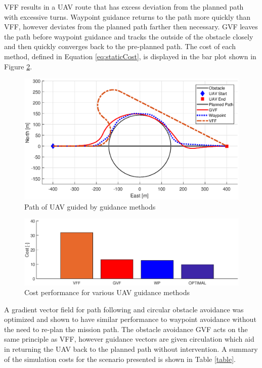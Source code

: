 \documentclass[numbered,pdftex]{ohio-etd}
\begin{document}
VFF results in a UAV route that has excess deviation from the planned path with excessive turns. Waypoint guidance returns to the path more quickly than VFF, however deviates from the planned path farther then necessary. GVF leaves the path before waypoint guidance and tracks the outside of the obstacle closely and then quickly converges back to the pre-planned path. The cost of each method, defined in Equation \ref{eq:staticCost}, is displayed in the bar plot shown in Figure \ref{fig:barplotperformance}.


\begin{figure}[H]
	\centering
	\includegraphics[trim=0 50 0 65,clip,width=15cm]{Figures/Simulations/compareMethods}
	\caption{Path of UAV guided by guidance methods}
	\label{fig:comparemethods}
\end{figure}


\begin{figure}[H]
	\centering
	\label{fig:barPlotCost}
	\includegraphics[width=15cm]{Figures/Simulations/barPlotPerformance}
	\caption{Cost performance for various UAV guidance methods}
	\label{fig:barplotperformance}
\end{figure}

A gradient vector field for path following and circular obstacle avoidance was optimized and shown to have similar performance to waypoint avoidance without the need to re-plan the mission path. The obstacle avoidance GVF acts on the same principle as VFF, however guidance vectors are given circulation which aid in returning the UAV back to the planned path without intervention. A summary of the simulation costs for the scenario presented is shown in Table \ref{table}.
\end{document}

